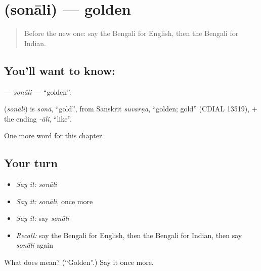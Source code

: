 \section[\texorpdfstring{\bn{সোনালি} (sonāli)}{সোনালি (sonāli)}]{ (sonāli) — golden}

\label{lesson:BN-C246-sonali}



\begin{quote}
Before the new one: say the Bengali for English, then the Bengali for Indian.
\end{quote}

\subsection*{You'll want to know: }
\textbf{} — \emph{sonāli} — \textquotedblleft{}golden\textquotedblright{}.

\begin{cousinweb}
\textbf{} (\emph{sonāli}) is \emph{sonā}, \textquotedblleft{}gold\textquotedblright{}, from Sanskrit \emph{suvarṇa}, \textquotedblleft{}golden; gold\textquotedblright{} (CDIAL 13519), + the ending \emph{-āli}, \textquotedblleft{}like\textquotedblright{}.
\end{cousinweb}

\begin{grammarlens}[title={What you've built}]
One more word for this chapter.
\end{grammarlens}

\subsection*{Your turn}
\begin{itemize}
\raggedright
  \item \emph{Say it:} \emph{sonāli}
  \item \emph{Say it:} \emph{sonāli}, once more
  \item \emph{Say it:} say \emph{sonāli}
  \item \emph{Recall:} say the Bengali for English, then the Bengali for Indian, then say \emph{sonāli} again
\end{itemize}

\begin{tcolorbox}[breakable,colback=teal!4,colframe=teal!35!black,title={Before you move on}]
What does  mean? (\textquotedblleft{}Golden\textquotedblright{}.) Say it once more.
\end{tcolorbox}
